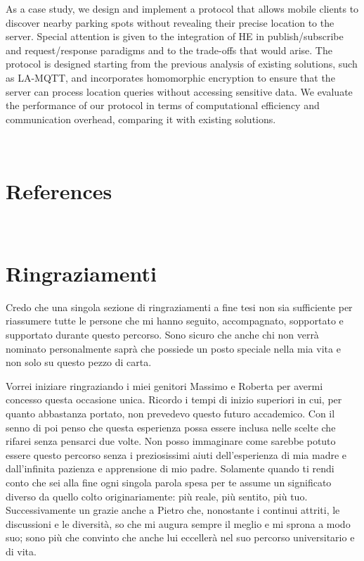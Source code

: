 \documentclass[12pt,a4paper,twoside]{book}
\begin{document}
As a case study, we design and implement a protocol that allows mobile clients to discover nearby parking spots without revealing their precise location to the server. 
Special attention is given to the integration of HE in publish/subscribe and request/response paradigms and to the trade-offs that would arise.
The protocol is designed starting from the previous analysis of existing solutions, such as LA-MQTT, and incorporates homomorphic encryption to ensure that the server can process location queries without accessing sensitive data. We evaluate the performance of our protocol in terms of computational efficiency and communication overhead, comparing it with existing solutions.

\topmargin=-1cm
\tableofcontents
\thispagestyle{empty}
\listoftables
\thispagestyle{empty}
\listoffigures
\thispagestyle{empty}
\newpage~\newpage

\raggedbottom

\pagestyle{plain}
\setcounter{page}{1}










\renewcommand{\bibsection}{}
\chapter*{References}

\newpage

\renewcommand{\appendixtocname}{Appendices}
{}

\newpage~\newpage
\chapter*{Ringraziamenti}
Credo che una singola sezione di ringraziamenti a fine tesi non sia sufficiente per riassumere tutte le persone che mi hanno seguito, accompagnato, sopportato e supportato durante questo percorso. Sono sicuro che anche chi non verrà nominato personalmente saprà che possiede un posto speciale nella mia vita e non solo su questo pezzo di carta.

Vorrei iniziare ringraziando i miei genitori Massimo e Roberta per avermi concesso questa occasione unica. Ricordo i tempi di inizio superiori in cui, per quanto abbastanza portato, non prevedevo questo futuro accademico. Con il senno di poi penso che questa esperienza possa essere inclusa nelle scelte che rifarei senza pensarci due volte. Non posso immaginare come sarebbe potuto essere questo percorso senza i preziosissimi aiuti dell'esperienza di mia madre e dall'infinita pazienza e apprensione di mio padre. Solamente quando ti rendi conto che sei alla fine ogni singola parola spesa per te assume un significato diverso da quello colto originariamente: più reale, più sentito, più tuo.
Successivamente un grazie anche a Pietro che, nonostante i continui attriti, le discussioni e le diversità, so che mi augura sempre il meglio e mi sprona a modo suo; sono più che convinto che anche lui eccellerà nel suo percorso universitario e di vita.
\end{document}
